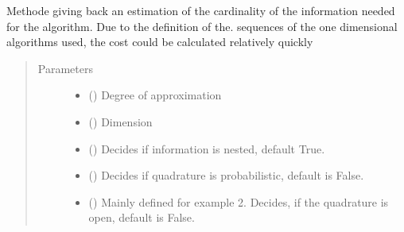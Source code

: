\documentclass[letterpaper,10pt,english]{sphinxmanual}
\begin{document}
\begin{fulllineitems}
\label{\detokenize{index:Studienprojekt_Smolyak_qmc_one_point.cost_smolyak}}
Methode giving back an estimation of the cardinality of the information needed for the algorithm.
Due to the definition of the. sequences of the one dimensional algorithms used, the cost could be calculated
relatively quickly
\begin{quote}\begin{description}
\item[{Parameters}] \leavevmode\begin{itemize}
\item {} 
 () \textendash{} Degree of approximation

\item {} 
 () \textendash{} Dimension

\item {} 
 (\sphinxstyleliteralemphasis{\sphinxupquote{, }}) \textendash{} Decides if information is nested, default True.

\item {} 
 (\sphinxstyleliteralemphasis{\sphinxupquote{, }}) \textendash{} Decides if quadrature is probabilistic, default is False.

\item {} 
 (\sphinxstyleliteralemphasis{\sphinxupquote{, }}) \textendash{} Mainly defined for example 2. Decides, if the quadrature is open, default is False.


\end{itemize}
\end{description}
\end{quote}
\end{fulllineitems}
\end{document}
